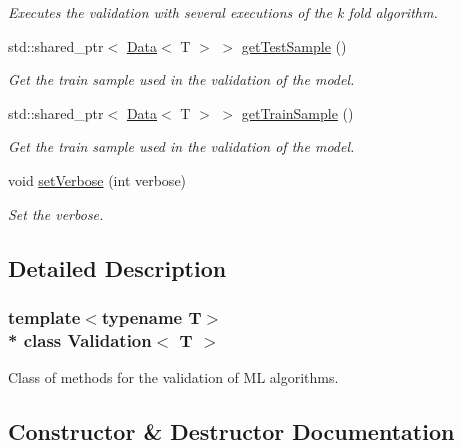 \begin{DoxyCompactItemize}
\begin{DoxyCompactList}\small\item\em Executes the validation with several executions of the k fold algorithm. \end{DoxyCompactList}\item 
std\+::shared\+\_\+ptr$<$ \hyperlink{class_data}{Data}$<$ T $>$ $>$ \hyperlink{class_validation_a2370445658f5e86e39e8c18fc8b971d0}{get\+Test\+Sample} ()
\begin{DoxyCompactList}\small\item\em Get the train sample used in the validation of the model. \end{DoxyCompactList}\item 
std\+::shared\+\_\+ptr$<$ \hyperlink{class_data}{Data}$<$ T $>$ $>$ \hyperlink{class_validation_a11cf518681b25799f231ce973ad45095}{get\+Train\+Sample} ()
\begin{DoxyCompactList}\small\item\em Get the train sample used in the validation of the model. \end{DoxyCompactList}\item 
void \hyperlink{class_validation_adddf2e9eb960b7636e6615ecbd9783bb}{set\+Verbose} (int verbose)
\begin{DoxyCompactList}\small\item\em Set the verbose. \end{DoxyCompactList}\end{DoxyCompactItemize}


\subsection{Detailed Description}
\subsubsection*{template$<$typename T$>$\\*
class Validation$<$ T $>$}

Class of methods for the validation of ML algorithms. 

\subsection{Constructor \& Destructor Documentation}
